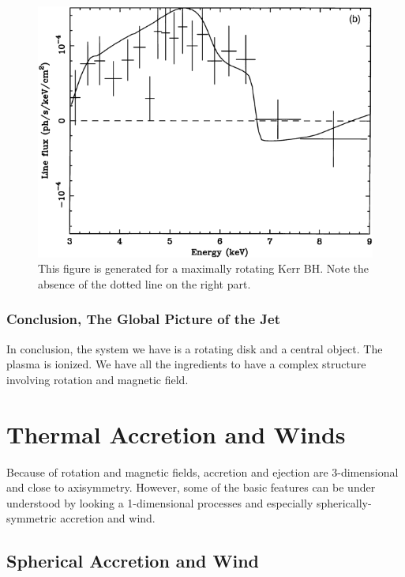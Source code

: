 \documentclass[10pt,a4paper,english]{article}
\begin{document}
\begin{figure}[!ht]
  \begin{center}
    \includegraphics{figures/young-2.png}
    \caption{This figure is generated for a maximally rotating Kerr BH. Note the absence
      of the dotted line on the right part. \cite{Young1998}}
  \end{center}
\end{figure}
\subsubsection{Conclusion, The Global Picture of the Jet}

In conclusion, the system we have is a rotating disk and a central object. The
plasma is ionized. We have all the ingredients to have a complex structure
involving rotation and magnetic field.

\section{Thermal Accretion and Winds}

Because of rotation and magnetic fields, accretion and ejection are
3-dimensional and close to axisymmetry. However, some of the basic features can
be under understood by looking a 1-dimensional processes and especially
spherically-symmetric accretion and wind.

\subsection{Spherical Accretion and Wind}
\end{document}
